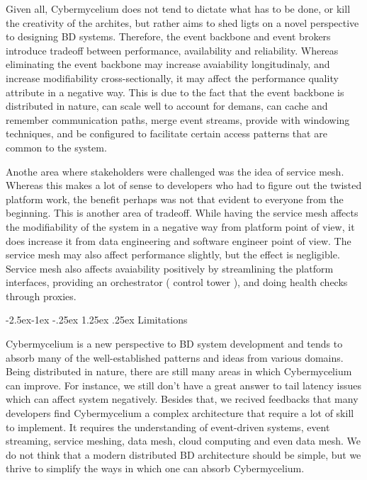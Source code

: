 \documentclass[review]{elsarticle}
\makeatletter
\renewcommand\paragraph{\@startsection{paragraph}{4}{\z@}%
            {-2.5ex\@plus -1ex \@minus -.25ex}%
            {1.25ex \@plus .25ex}%
            {\normalfont\normalsize\itshape}}
\makeatother
\begin{document}
Given all, Cybermycelium does not tend to dictate what has to be done, or kill the creativity of the archites, but rather aims to shed ligts on a novel perspective to designing BD systems. Therefore, the event backbone and event brokers introduce tradeoff between performance, availability and reliability. Whereas eliminating the event backbone may increase avaiability longitudinaly, and increase modifiability cross-sectionally, it may affect the performance quality attribute in a negative way. This is due to the fact that the event backbone is distributed in nature, can scale well to account for demans, can cache and remember communication paths, merge event streams, provide with windowing techniques, and be configured to facilitate certain access patterns that are common to the system.

Anothe area where stakeholders were challenged was the idea of service mesh. Whereas this makes a lot of sense to developers who had to figure out the twisted platform work, the benefit perhaps was not that evident to everyone from the beginning. This is another area of tradeoff. While having the service mesh affects the modifiability of the system in a negative way from platform point of view, it does increase it from data engineering and software engineer point of view. The service mesh may also affect performance slightly, but the effect is negligible. Service mesh also affects avaiability positively by streamlining the platform interfaces, providing an orchestrator ( control tower ), and doing health checks through proxies.

\paragraph{Limitations}

Cybermycelium is a new perspective to BD system development and tends to absorb many of the well-established patterns and ideas from various domains. Being distributed in nature, there are still many areas in which Cybermycelium can improve. For instance, we still don't have a great answer to tail latency issues which can affect system negatively. Besides that, we recived feedbacks that many developers find Cybermycelium a complex architecture that require a lot of skill to implement. It requires the understanding of event-driven systems, event streaming, service meshing, data mesh, cloud computing and even data mesh. We do not think that a modern distributed BD architecture should be simple, but we thrive to simplify the ways in which one can absorb Cybermycelium.
\end{document}
